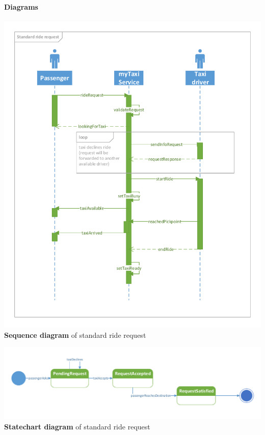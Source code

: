 	\paragraph{Diagrams}
		\begin{center}
	\includegraphics[width=\textwidth]{diagrams/standard_request}
	\textbf{Sequence diagram} of standard ride request
\end{center}
\begin{center}
	\includegraphics[width=\textwidth]{diagrams/standard_state}
	\textbf{Statechart diagram} of standard ride request
\end{center}
	
